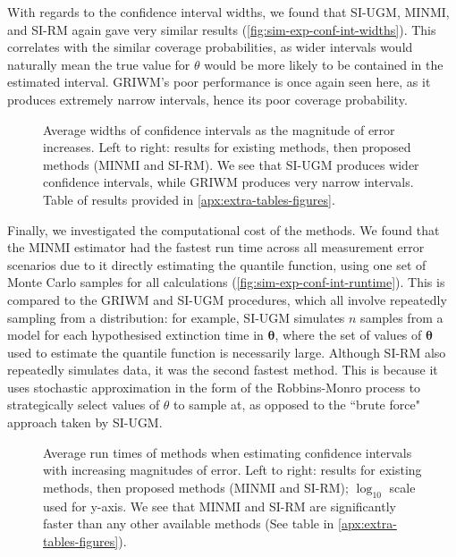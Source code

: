 With regards to the confidence interval widths, we found that SI-UGM, MINMI, and SI-RM again gave very similar results (\autoref{fig:sim-exp-conf-int-widths}). This correlates with the similar coverage probabilities, as wider intervals would naturally mean the true value for $\theta$ would be more likely to be contained in the  estimated interval. GRIWM's poor performance is once again seen here, as it produces extremely narrow intervals, hence its poor coverage probability.
\begin{figure}[ht]
    \centering
    
    \caption{Average widths of confidence intervals as the magnitude of error increases. Left to right: results for existing methods, then proposed methods (MINMI and SI-RM). We see that SI-UGM produces wider confidence intervals, while GRIWM produces very narrow intervals. Table of results provided in \autoref{apx:extra-tables-figures}.}
    \label{fig:sim-exp-conf-int-widths}
\end{figure}

Finally, we investigated the computational cost of the methods. We found that the MINMI estimator had the fastest run time across all measurement error scenarios due to it directly estimating the quantile function, using one set of Monte Carlo samples for all calculations (\autoref{fig:sim-exp-conf-int-runtime}). This is compared to the GRIWM and SI-UGM procedures, which all involve repeatedly sampling from a distribution: for example, SI-UGM simulates $n$ samples from a model for each hypothesised extinction time in $\bm{\theta}$, where the set of values of $\bm{\theta}$ used to estimate the quantile function is necessarily large. Although SI-RM also repeatedly simulates data, it was the second fastest method. This is because it uses stochastic approximation in the form of the Robbins-Monro process to strategically select values of $\theta$ to sample at, as opposed to the ``brute force" approach taken by SI-UGM.
\begin{figure}[ht]
    \centering
    
    \caption{Average run times of methods when estimating confidence intervals with increasing magnitudes of error. Left to right: results for existing methods, then proposed methods (MINMI and SI-RM); $\log_{10}$ scale used for y-axis. We see that MINMI and SI-RM are significantly faster than any other available methods (See table in \autoref{apx:extra-tables-figures}).}
    \label{fig:sim-exp-conf-int-runtime}
\end{figure}